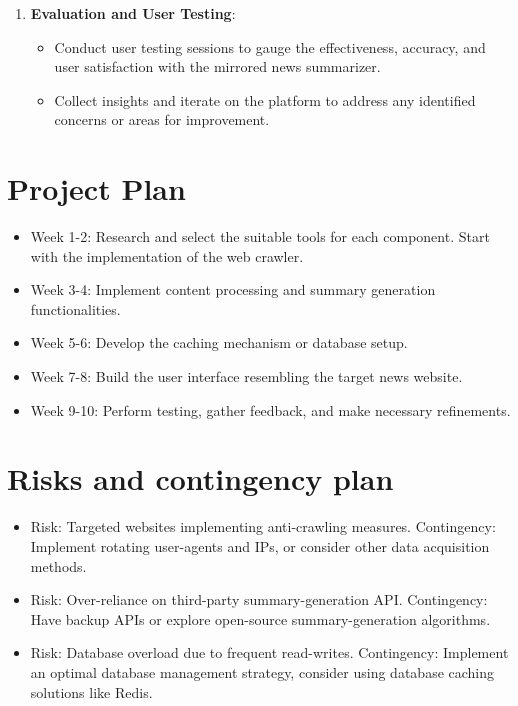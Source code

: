 \documentclass[a4paper]{article}
\begin{document}
\begin{enumerate}
\begin{itemize}
        \end{itemize}
    \item {\bf Evaluation and User Testing}:
        \begin{itemize}
            \item Conduct user testing sessions to gauge the effectiveness, accuracy, and user satisfaction with the mirrored news summarizer.
            \item Collect insights and iterate on the platform to address any identified concerns or areas for improvement.
        \end{itemize}
\end{enumerate}

\section{Project Plan}

\begin{itemize}
    \item Week 1-2: Research and select the suitable tools for each component. Start with the implementation of the web crawler.
    \item Week 3-4: Implement content processing and summary generation functionalities.
    \item Week 5-6: Develop the caching mechanism or database setup.
    \item Week 7-8: Build the user interface resembling the target news website.
    \item Week 9-10: Perform testing, gather feedback, and make necessary refinements.
\end{itemize}

\section{Risks and contingency plan}

\begin{itemize}
    \item Risk: Targeted websites implementing anti-crawling measures.
    \subitem Contingency: Implement rotating user-agents and IPs, or consider other data acquisition methods.
    \item Risk: Over-reliance on third-party summary-generation API.
    \subitem Contingency: Have backup APIs or explore open-source summary-generation algorithms.
    \item Risk: Database overload due to frequent read-writes.
    \subitem Contingency: Implement an optimal database management strategy, consider using database caching solutions like Redis.
\end{itemize}
\end{document}
